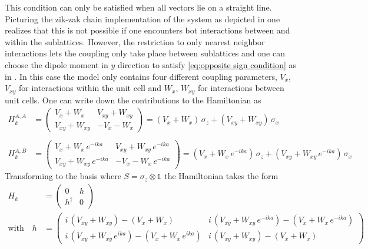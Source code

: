 This condition can only be satisfied when all vectors lie on a straight line. Picturing the zik-zak chain implementation of the system as depicted in  one realizes that this is not possible if one encounters bot interactions between  and within the sublattices.
However, the restriction to only nearest neighbor interactions lets the coupling only take place between sublattices and one can choose the dipole moment in $y$ direction to satisfy \eqref{eq:opposite sign condition} as in . In this case the model only contains four different coupling parameters, $V_x$, $V_{xy}$ for interactions within the unit cell and $W_x$, $W_{xy}$ for interactions between unit cells. One can write down the contributions to the Hamiltonian as
\begin{align*}
    H_k^{A,A}&=\begin{pmatrix}
        V_x + W_x & V_{xy} + W_{xy}\\
        V_{xy} + W_{xy} & -V_x - W_x
    \end{pmatrix}=(V_x + W_x)\,\sigma_z+(V_{xy} + W_{xy})\,\sigma_x\\\\
    H_k^{A,B} &= \begin{pmatrix}
        V_x + W_x \, e^{-ika}& V_{xy} + W_{xy}\, e^{-ika}\\
        V_{xy} + W_{xy} \, e^{-ika}& -V_x - W_x\, e^{-ika}
    \end{pmatrix}=\left(V_x + W_x\, e^{-ika}\right)\,\sigma_z+\left(V_{xy} + W_{xy}\, e^{-ika}\right)\,\sigma_x
\end{align*}
Transforming to the basis where $S=\sigma_z\otimes\mathbb{1}$ the Hamiltonian takes the form
\begin{align*}
    H_k&=\begin{pmatrix}
        0&h\\
        h^\dagger&0
    \end{pmatrix}\\
    \text{with}\quad h&= \begin{pmatrix}i\,(V_{xy}+W_{xy})-(V_x+W_x)  & i\,\left(V_{xy} + W_{xy}\, e^{-ika}\right)-\left(V_x + W_x\, e^{-ika}\right)\\
        i\,\left(V_{xy} + W_{xy}\, e^{ika}\right)-\left(V_x + W_x\, e^{ika}\right) & i\,(V_{xy}+W_{xy})-(V_x+W_x)
    \end{pmatrix}
\end{align*}
